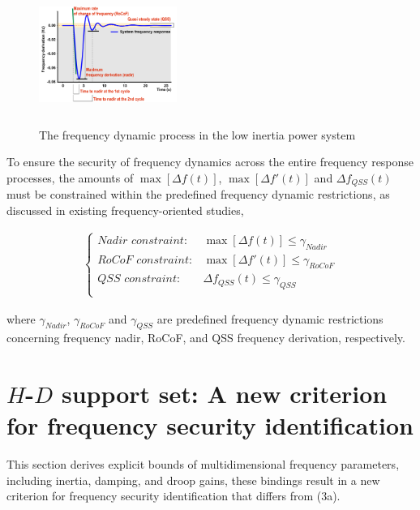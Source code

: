 \documentclass[lettersize,journal]{IEEEtran}
\begin{document}
\begin{figure}[!t]
  \centering
  \includegraphics[width=0.4\textwidth,height=4.5cm]{frequency_response.pdf}\vspace{-0.25cm}
  \caption{The frequency dynamic process in the low inertia power system}\vspace{-0.25cm}
  \label{fig:sfr}
\end{figure}

To ensure the security of frequency dynamics across the entire frequency response processes, the amounts of $\max[\varDelta f(t)]$, $\max[\varDelta f'(t)]$ and $\varDelta f_{QSS}(t)$ must be constrained within the predefined frequency dynamic restrictions, as discussed in existing frequency-oriented studies,

\vspace{-0.25cm}
\begin{subequations}
  \begin{align}
  \left \{
  \begin{array}{rr}
  {Nadir\,\, constraint:}& \max[\varDelta f (t)] \leq \gamma_{Nadir}\\
  {RoCoF\,\, constraint:}&\max[\varDelta f' (t)] \leq \gamma_{RoCoF}\\
  {QSS\,\, constraint:} &\varDelta f_{QSS} (t) \leq \gamma_{QSS}\\
\end{array}
\right.
    \end{align}
  \end{subequations}

  \noindent
where $\gamma_{Nadir}$, $\gamma_{RoCoF}$ and $\gamma_{QSS}$ are predefined frequency dynamic restrictions concerning frequency nadir, RoCoF, and QSS frequency derivation, respectively.

\section{$H$-$D$ support set: A new criterion for frequency security identification}

This section derives explicit bounds of multidimensional frequency parameters, including inertia, damping, and droop gains, these bindings result in a new criterion for frequency security identification that differs from (3a).
\end{document}
